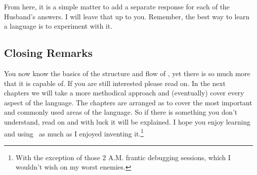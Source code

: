 From here, it is a simple matter to add a separate response for each of the Husband's answers.  I will leave that up to you.  Remember, the best way to learn a language is to experiment with it.

\subsection{Closing Remarks}

You now know the basics of the structure and flow of \SSquared, yet there is so much more that it is capable of.  If you are still interested please read on.  In the next chapters we will take a more methodical approach and (eventually) cover every aspect of the language.  The chapters are arranged as to cover the most important and commonly used areas of the language.  So if there is something you don't understand, read on and with luck it will be explained. I hope you enjoy learning and using \SSquared\ as much as I enjoyed inventing it.\footnote{With the exception of those 2 A.M. frantic debugging sessions, which I wouldn't wish on my worst enemies.}